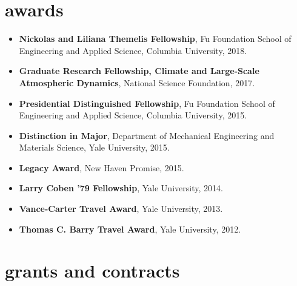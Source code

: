 \documentclass[10pt,oneside]{article}
\begin{document}

\section{awards}

\mbox{}\vspace{-\dimexpr\baselineskip\relax}

\begin{itemize}[label={}]
  
  \item \textbf{Nickolas and Liliana Themelis Fellowship}, Fu Foundation School of Engineering and Applied Science, Columbia University, 2018.
        
  \item \textbf{Graduate Research Fellowship, Climate and Large-Scale Atmospheric Dynamics}, National Science Foundation, 2017.
        
  \item \textbf{Presidential Distinguished Fellowship}, Fu Foundation School of Engineering and Applied Science, Columbia University, 2015.
        
  \item \textbf{Distinction in Major}, Department of Mechanical Engineering and Materials Science, Yale University, 2015.
        
  \item \textbf{Legacy Award}, New Haven Promise, 2015.
        
  \item \textbf{Larry Coben '79 Fellowship}, Yale University, 2014.
        
  \item \textbf{Vance-Carter Travel Award}, Yale University, 2013.
        
  \item \textbf{Thomas C. Barry Travel Award}, Yale University, 2012.
        
\end{itemize}



\section{grants and contracts}

\mbox{}\vspace{-\dimexpr\baselineskip\relax}
\end{document}
